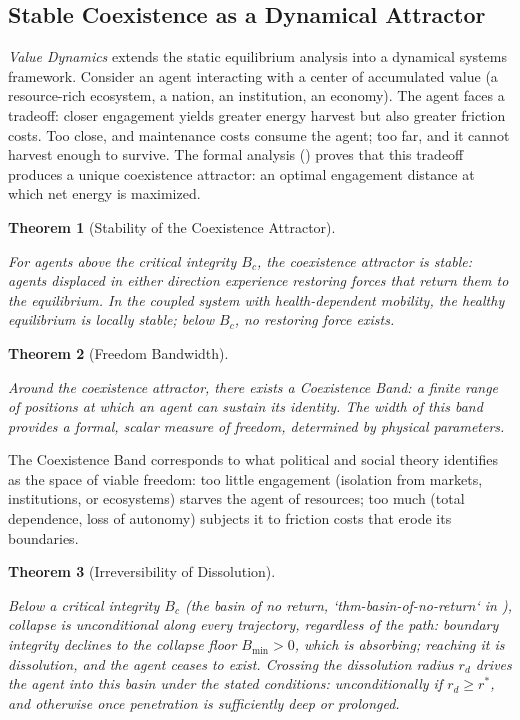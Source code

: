 \documentclass[11pt]{article}
\theoremstyle{plain}
\newtheorem{theorem}{Theorem}
\theoremstyle{definition}
\theoremstyle{remark}
\let\origsubsection\subsection
\renewcommand{\subsection}{\needspace{7\baselineskip}\origsubsection}
\begin{document}
\subsection{Stable Coexistence as a Dynamical
Attractor}\label{stable-coexistence-as-a-dynamical-attractor}

\emph{Value Dynamics} \citep{TC-VI} extends the static equilibrium
analysis into a dynamical systems framework. Consider an agent
interacting with a center of accumulated value (a resource-rich
ecosystem, a nation, an institution, an economy). The agent faces a
tradeoff: closer engagement yields greater energy harvest but also
greater friction costs. Too close, and maintenance costs consume the
agent; too far, and it cannot harvest enough to survive. The formal
analysis (\citep{TC-VI}) proves that this tradeoff produces a unique
coexistence attractor: an optimal engagement distance at which net
energy is maximized.

\begin{theorem}[Stability of the Coexistence Attractor]
\label{ethics-thm-coexistence}

For agents above the critical integrity $B_c$, the coexistence attractor is stable: agents displaced in either direction experience restoring forces that return them to the equilibrium. In the coupled system with health-dependent mobility, the healthy equilibrium is locally stable; below $B_c$, no restoring force exists. \citep{TC-VI}
\end{theorem}

\begin{theorem}[Freedom Bandwidth]
\label{ethics-thm-freedom-bandwidth}

Around the coexistence attractor, there exists a Coexistence Band: a finite range of positions at which an agent can sustain its identity. The width of this band provides a formal, scalar measure of freedom, determined by physical parameters. \citep{TC-VI}
\end{theorem}

The Coexistence Band corresponds to what political and social theory
identifies as the space of viable freedom: too little engagement
(isolation from markets, institutions, or ecosystems) starves the agent
of resources; too much (total dependence, loss of autonomy) subjects it
to friction costs that erode its boundaries.

\begin{theorem}[Irreversibility of Dissolution]
\label{ethics-thm-dissolution}

Below a critical integrity $B_c$ (the basin of no return, `thm-basin-of-no-return` in \citep{TC-VI}), collapse is unconditional along every trajectory, regardless of the path: boundary integrity declines to the collapse floor $B_{\min} > 0$, which is absorbing; reaching it is dissolution, and the agent ceases to exist. Crossing the dissolution radius $r_d$ drives the agent into this basin under the stated conditions: unconditionally if $r_d \geq r^*$, and otherwise once penetration is sufficiently deep or prolonged. \citep{TC-VI}
\end{theorem}
\end{document}
